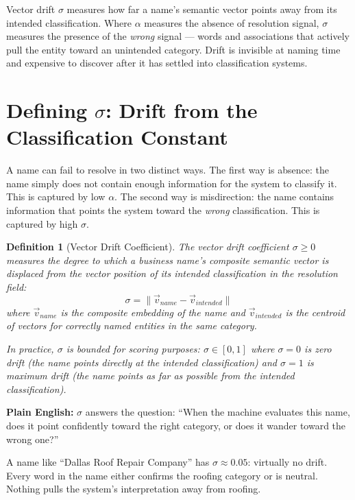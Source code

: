 \documentclass[12pt, openany]{book}
\theoremstyle{thmstyle}
\theoremstyle{defstyle}
\newtheorem{definition}{Definition}[chapter]
\begin{document}
\begin{keybox}
Vector drift $\sigma$ measures how far a name's semantic vector points away from its intended classification. Where $\alpha$ measures the absence of resolution signal, $\sigma$ measures the presence of the \textit{wrong} signal --- words and associations that actively pull the entity toward an unintended category. Drift is invisible at naming time and expensive to discover after it has settled into classification systems.
\end{keybox}

\section{Defining $\sigma$: Drift from the Classification Constant}

A name can fail to resolve in two distinct ways. The first way is absence: the name simply does not contain enough information for the system to classify it. This is captured by low $\alpha$. The second way is misdirection: the name contains information that points the system toward the \textit{wrong} classification. This is captured by high $\sigma$.

\begin{definition}[Vector Drift Coefficient]
The vector drift coefficient $\sigma \geq 0$ measures the degree to which a business name's composite semantic vector is displaced from the vector position of its intended classification in the resolution field:
\[
\sigma = \|\vec{v}_{name} - \vec{v}_{intended}\|
\]
where $\vec{v}_{name}$ is the composite embedding of the name and $\vec{v}_{intended}$ is the centroid of vectors for correctly named entities in the same category.

In practice, $\sigma$ is bounded for scoring purposes: $\sigma \in [0, 1]$ where $\sigma = 0$ is zero drift (the name points directly at the intended classification) and $\sigma = 1$ is maximum drift (the name points as far as possible from the intended classification).
\end{definition}

\textbf{Plain English:} $\sigma$ answers the question: ``When the machine evaluates this name, does it point confidently toward the right category, or does it wander toward the wrong one?''

A name like ``Dallas Roof Repair Company'' has $\sigma \approx 0.05$: virtually no drift. Every word in the name either confirms the roofing category or is neutral. Nothing pulls the system's interpretation away from roofing.
\end{document}
